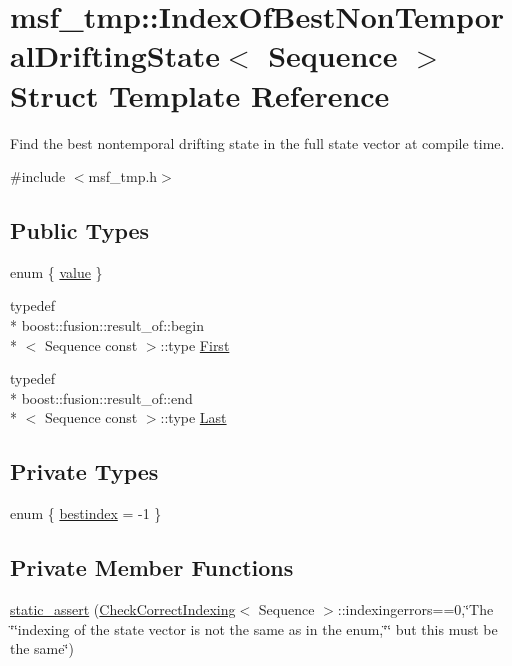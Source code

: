 \hypertarget{structmsf__tmp_1_1IndexOfBestNonTemporalDriftingState}{\section{msf\-\_\-tmp\-:\-:Index\-Of\-Best\-Non\-Temporal\-Drifting\-State$<$ Sequence $>$ Struct Template Reference}
\label{structmsf__tmp_1_1IndexOfBestNonTemporalDriftingState}
}


Find the best nontemporal drifting state in the full state vector at compile time.  




{\ttfamily \#include $<$msf\-\_\-tmp.\-h$>$}

\subsection*{Public Types}
\begin{DoxyCompactItemize}
\item 
enum \{ \hyperlink{structmsf__tmp_1_1IndexOfBestNonTemporalDriftingState_a8fc0a3f5c71a072f984cc9ad318ae803a83c8cb635dce2b45676d6997c1ee9a6f}{value}
 \}
\item 
typedef \\*
boost\-::fusion\-::result\-\_\-of\-::begin\\*
$<$ Sequence const  $>$\-::type \hyperlink{structmsf__tmp_1_1IndexOfBestNonTemporalDriftingState_a9f25e8cd8a466ed4bc97cd51b6a953e0}{First}
\item 
typedef \\*
boost\-::fusion\-::result\-\_\-of\-::end\\*
$<$ Sequence const  $>$\-::type \hyperlink{structmsf__tmp_1_1IndexOfBestNonTemporalDriftingState_a66dd8d7ca1fbe97b50c94896293c952f}{Last}
\end{DoxyCompactItemize}
\subsection*{Private Types}
\begin{DoxyCompactItemize}
\item 
enum \{ \hyperlink{structmsf__tmp_1_1IndexOfBestNonTemporalDriftingState_a5e3192e8bb76fae3485111504cb775cba9540152cd0cc657b1e5bfd4086b0005f}{bestindex} =  -\/1
 \}
\end{DoxyCompactItemize}
\subsection*{Private Member Functions}
\begin{DoxyCompactItemize}
\item 
\hyperlink{structmsf__tmp_1_1IndexOfBestNonTemporalDriftingState_ac45a91feef3e1c46195e14d44e7deef7}{static\-\_\-assert} (\hyperlink{structmsf__tmp_1_1CheckCorrectIndexing}{Check\-Correct\-Indexing}$<$ Sequence $>$\-::indexingerrors==0,\char`\"{}The \char`\"{}\char`\"{}indexing of the state vector is not the same as in the enum,\char`\"{}\char`\"{} but this must be the same\char`\"{})
\end{DoxyCompactItemize}



